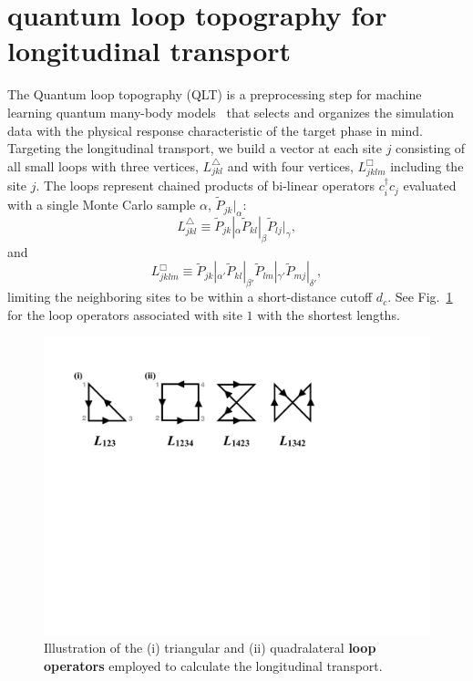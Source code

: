 \documentclass[amsmath,amssymb, aps, prl, twocolumn]{revtex4-1}
\begin{document}
\section{quantum loop topography for longitudinal transport}
The Quantum loop topography (QLT) is a preprocessing step for machine learning quantum many-body models~\cite{qlt2016} that selects and organizes the simulation data with the physical response characteristic of the target phase in mind. Targeting the longitudinal transport,  we build a vector at each site $j$ consisting of all small loops with three vertices, $L^\triangle_{jkl}$ and with four vertices, $L^\Box_{jklm}$ including the site $j$. The loops represent
chained products of bi-linear operators  $c_i^\dagger c_j$ evaluated with a single Monte Carlo sample $\alpha$, $\widetilde{P}_{jk}|_{\alpha}$:
\begin{equation}
    L^\triangle_{jkl}\equiv\widetilde{P}_{jk}|_{\alpha} \widetilde{P}_{kl}|_{\beta} \widetilde{P}_{lj}|_{\gamma},
    \label{eq:triangle}
\end{equation}
and 
\begin{equation}
L^\Box_{jklm}\equiv\widetilde{P}_{jk}|_{\alpha'} \widetilde{P}_{kl}|_{\beta'} \widetilde{P}_{lm}|_{\gamma'} \widetilde{P}_{mj}|_{\delta'},
\label{eq:quad}
\end{equation}
limiting the neighboring sites to be within a short-distance cutoff $d_c$. See Fig.~\ref{fig:loops} for the loop operators associated with site $1$ with the shortest lengths.

\begin{figure}
\includegraphics[scale=0.48]{LoopOperators.pdf}
\caption{
 Illustration of the (i) triangular and (ii) quadralateral {\bf loop operators} employed to calculate the longitudinal transport. 
}\label{fig:loops}
\end{figure}
\end{document}
